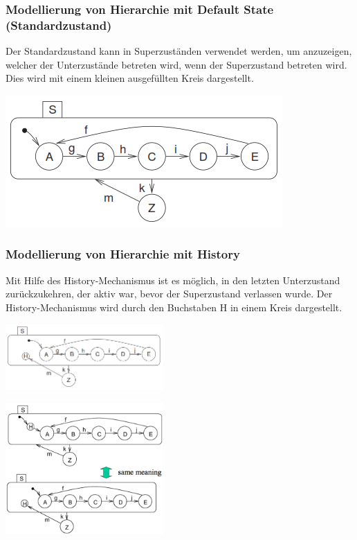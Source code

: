 \subsubsection{Modellierung von Hierarchie mit Default State (Standardzustand)}
\begin{multicols}{2}
  Der Standardzustand kann in Superzuständen verwendet werden, um anzuzeigen, welcher der Unterzustände betreten wird, wenn der Superzustand betreten wird.
  Dies wird mit einem kleinen ausgefüllten Kreis dargestellt.\\
  \vfill\null
  \columnbreak
  \begin{center}
    \includegraphics[width=0.6\linewidth]{images/FSM/Hierarchie_DefaultState}
  \end{center}
\end{multicols}

\subsubsection{Modellierung von Hierarchie mit History}
Mit Hilfe des History-Mechanismus ist es möglich, in den letzten Unterzustand zurückzukehren, der aktiv war, bevor der Superzustand verlassen wurde. Der History-Mechanismus wird durch den Buchstaben H in
einem Kreis dargestellt.\\
\begin{minipage}[hbt]{8cm}
  \includegraphics[width=6cm]{images/FSM/Hierarchie_History}
\end{minipage}
\begin{minipage}[hbt]{6cm}
  \includegraphics[width = 6cm]{images/FSM/history_default_state_mechanism}
\end{minipage}
\pagebreak\newpage

